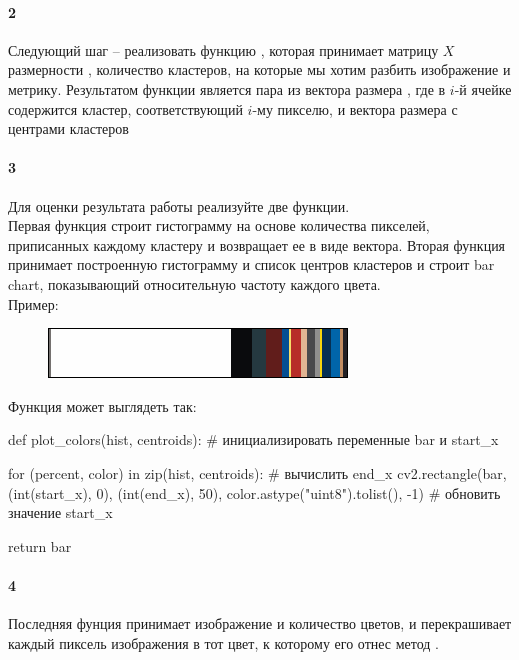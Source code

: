 \documentclass[a4paper,12pt]{article}
\begin{document}
\paragraph{2} Следующий шаг -- реализовать функцию , которая принимает матрицу $X$ размерности , количество кластеров, на которые мы хотим разбить изображение и метрику. Результатом функции является пара из вектора размера , где в $i$-й ячейке содержится кластер, соответствующий $i$-му пикселю, и вектора размера  с центрами кластеров

\paragraph{3} Для оценки результата работы реализуйте две функции.\\
Первая функция  строит гистограмму на основе количества пикселей, приписанных каждому кластеру и возвращает ее в виде вектора.
Вторая функция  принимает построенную гистограмму и список центров кластеров и строит bar chart, показывающий относительную частоту каждого цвета. \\

\clearpage
Пример: 
\begin{figure}[htbp]
  \includegraphics{images/barchart}   
\end{figure}

Функция может выглядеть так:\\
\begin{python3}
def plot_colors(hist, centroids):
    # инициализировать переменные bar и start_x

    for (percent, color) in zip(hist, centroids):
        # вычислить end_x
        cv2.rectangle(bar, (int(start_x), 0), (int(end_x), 50),
            color.astype("uint8").tolist(), -1)
        # обновить значение start_x

    return bar
	
\end{python3}


\paragraph{4} Последняя фунция  принимает изображение и количество цветов, и перекрашивает каждый пиксель изображения в тот цвет, к которому его отнес метод .
\end{document}
